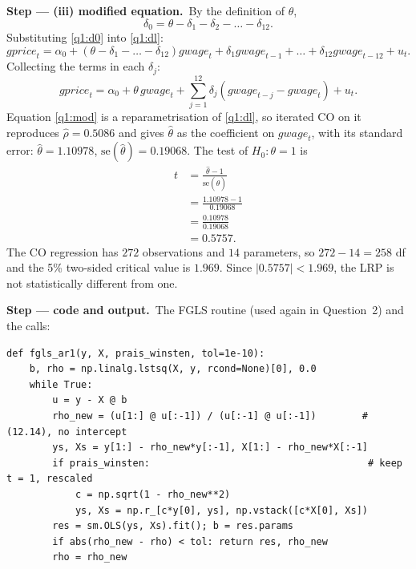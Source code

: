 \documentclass[11pt,a4paper]{article}
\numberwithin{equation}{questao}
\newcommand{\passo}[2]{\par\smallskip\noindent\textbf{Step --- #1.}~#2}
\newcommand{\var}[1]{\mathit{#1}}
\begin{document}
\begin{sol}
\passo{(iii) modified equation}{By the definition of $\theta$,
\begin{equation}
\delta_0=\theta-\delta_1-\delta_2-\dots-\delta_{12}. \label{q1:d0}
\end{equation}
Substituting \eqref{q1:d0} into \eqref{q1:dl}:
\begin{equation*}
\var{gprice}_t=\alpha_0+\left(\theta-\delta_1-\dots-\delta_{12}\right)\var{gwage}_t+\delta_1\var{gwage}_{t-1}+\dots+\delta_{12}\var{gwage}_{t-12}+u_t .
\end{equation*}
Collecting the terms in each $\delta_j$:
\begin{equation}
\var{gprice}_t=\alpha_0+\theta\,\var{gwage}_t+\sum_{j=1}^{12}\delta_j\left(\var{gwage}_{t-j}-\var{gwage}_t\right)+u_t. \label{q1:mod}
\end{equation}
Equation \eqref{q1:mod} is a reparametrisation of \eqref{q1:dl}, so iterated CO on it reproduces
$\hat\rho=0.5086$ and gives $\hat\theta$ as the coefficient on $\var{gwage}_t$, with its standard error:
$\hat\theta=1.10978$, $\mathrm{se}(\hat\theta)=0.19068$. The test of $H_0\colon\theta=1$ is
\begin{align*}
t &= \frac{\hat\theta-1}{\mathrm{se}(\hat\theta)}\\
&= \frac{1.10978-1}{0.19068}\\
&= \frac{0.10978}{0.19068}\\
&= 0.5757 .
\end{align*}
The CO regression has $272$ observations and $14$ parameters, so $272-14=258$ df and the 5\% two-sided
critical value is $1.969$. Since $|0.5757|<1.969$, the LRP is not statistically different from one.}

\passo{code and output}{The FGLS routine (used again in Question~2) and the calls:}
\begin{lstlisting}
def fgls_ar1(y, X, prais_winsten, tol=1e-10):
    b, rho = np.linalg.lstsq(X, y, rcond=None)[0], 0.0
    while True:
        u = y - X @ b
        rho_new = (u[1:] @ u[:-1]) / (u[:-1] @ u[:-1])        # (12.14), no intercept
        ys, Xs = y[1:] - rho_new*y[:-1], X[1:] - rho_new*X[:-1]
        if prais_winsten:                                      # keep t = 1, rescaled
            c = np.sqrt(1 - rho_new**2)
            ys, Xs = np.r_[c*y[0], ys], np.vstack([c*X[0], Xs])
        res = sm.OLS(ys, Xs).fit(); b = res.params
        if abs(rho_new - rho) < tol: return res, rho_new
        rho = rho_new


\end{lstlisting}
\end{sol}
\end{document}
